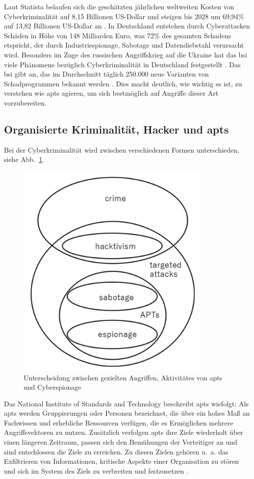 \documentclass[conference]{IEEEtran}
\begin{document}
Laut Statista belaufen sich die geschätzten jährlichen weltweiten Kosten von Cyberkriminalität auf 8,15 Billionen US-Dollar und steigen bis 2028 um 69,94\% auf 13,82 Billionen US-Dollar an \cite{Statista2023}.
In Deutschland entstehen durch Cyberattacken Schäden in Höhe von 148 Milliarden Euro, was 72\% des gesamten Schadens etspricht, der durch Industriespionage, Sabotage und Datendiebstahl verursacht wird.
Besonders im Zuge des russischen Angriffskrieg auf die Ukraine hat das \ac{bsi} viele Phänomene bezüglich Cyberkriminalität in Deutschland festgestellt \cite[S.~25]{BSI2023}.
Das \ac{bsi} gibt an, das im Durchschnitt täglich 250.000 neue Varianten von Schadprogrammen bekannt werden \cite[S.~13]{BSI2023}.
Dies macht deutlich, wie wichtig es ist, zu verstehen wie \acp{apt} agieren, um sich bestmöglich auf Angriffe dieser Art vorzubereiten.

\subsection{Organisierte Kriminalität, Hacker und \aclp*{apt}}
\label{sec:introduction:apt}

Bei der Cyberkriminalität wird zwischen verschiedenen Formen unterschieden, siehe Abb.~\ref{fig.destinction}.
\begin{figure}[htbp]
    \centerline{\includegraphics[scale=0.8]{figures/Destinction between targeted attacks, activity by APTs, and cyber-espionage.png}}
    \caption{Unterscheidung zwischen gezielten Angriffen, Aktivitätes von \acp{apt} und Cyberspionage \protect\cite[S.~6]{Steffens2020}}
    \label{fig.destinction}
\end{figure}
Das National Institute of Standards and Technology beschreibt \acp{apt} wiefolgt:
Als \acp{apt} werden Gruppierungen oder Personen bezeichnet, die über ein hohes Maß an Fachwissen und erhebliche Ressourcen verfügen, die es Ermöglichen mehrere Angriffsvektoren zu nutzen.
Zusätzlich verfolgen \acp{apt} ihre Ziele wiederholt über einen längeren Zeitraum, passen sich den Bemühungen der Verteitiger an und sind entschlossen die Ziele zu erreichen.
Zu diesen Zielen gehören u.~a. das Exfiltrieren von Informationen, kritische Aspekte einer Organisation zu stören und sich im System des Ziels zu verbreiten und festzusetzen \cite[S.~B-1]{NIST2011}.
\end{document}
